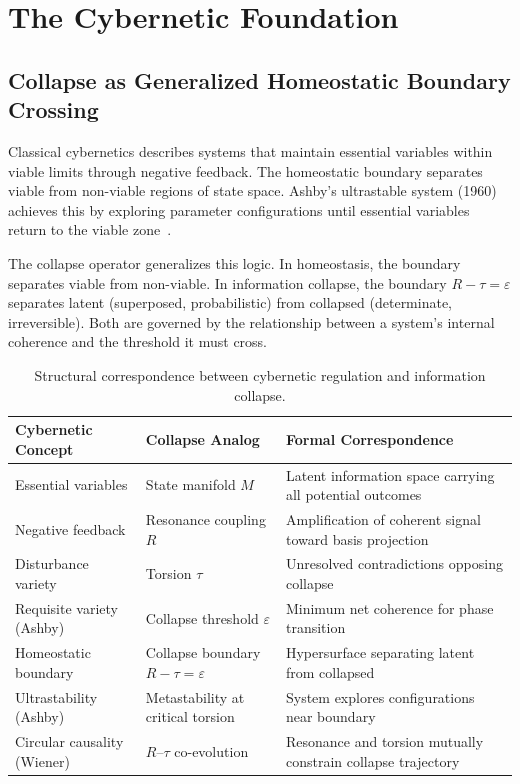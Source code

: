 \documentclass[11pt]{article}
\theoremstyle{plain}
\begin{document}
\section{The Cybernetic Foundation}

\subsection{Collapse as Generalized Homeostatic Boundary Crossing}

Classical cybernetics describes systems that maintain essential variables within viable limits
through negative feedback. The homeostatic boundary separates viable from non-viable regions of
state space. Ashby's ultrastable system (1960) achieves this by exploring parameter configurations
until essential variables return to the viable zone~\cite{ashby1960}.

The collapse operator generalizes this logic. In homeostasis, the boundary separates viable from
non-viable. In information collapse, the boundary $R - \tau = \varepsilon$ separates latent
(superposed, probabilistic) from collapsed (determinate, irreversible). Both are governed by the
relationship between a system's internal coherence and the threshold it must cross.

\begin{table}[h]
\centering
\caption{Structural correspondence between cybernetic regulation and information collapse.}
\begin{tabular}{>{\raggedright\arraybackslash}p{}
                >{\raggedright\arraybackslash}p{}
                >{\raggedright\arraybackslash}p{}}
\toprule
\textbf{Cybernetic Concept} & \textbf{Collapse Analog} & \textbf{Formal Correspondence} \\
\midrule
Essential variables & State manifold $M$ &
  Latent information space carrying all potential outcomes \\
Negative feedback & Resonance coupling $R$ &
  Amplification of coherent signal toward basis projection \\
Disturbance variety & Torsion $\tau$ &
  Unresolved contradictions opposing collapse \\
Requisite variety (Ashby) & Collapse threshold $\varepsilon$ &
  Minimum net coherence for phase transition \\
Homeostatic boundary & Collapse boundary $R - \tau = \varepsilon$ &
  Hypersurface separating latent from collapsed \\
Ultrastability (Ashby) & Metastability at critical torsion &
  System explores configurations near boundary \\
Circular causality (Wiener) & $R$--$\tau$ co-evolution &
  Resonance and torsion mutually constrain collapse trajectory \\
\bottomrule
\end{tabular}
\end{table}
\end{document}

